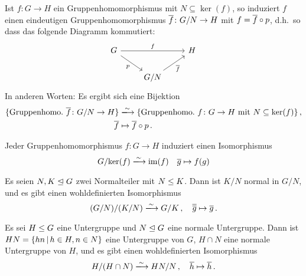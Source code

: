 \begin{theorem}[Homomorphiesatz]
  Ist $f \colon G \to H$ ein Gruppenhomomorphismus mit $N \subseteq \ker(f)$, so induziert $f$ einen eindeutigen Gruppenhomomorphismus $\overline{f} \colon G/N \to H$ mit $f = \overline{f} \circ p$, d.h.\ so dass das folgende Diagramm kommutiert:
  \[
    \begin{tikzcd}
        G
        \arrow{rr}[above]{f}
        \arrow{dr}[below left]{p}
      & {}
      & H
      \\
        {}
      & G/N
        \arrow{ru}[below right]{\induced{f}}
      & {}
    \end{tikzcd}
  \]
  In anderen Worten:
  Es ergibt sich eine Bijektion
  \begin{align*}
                            \{ \text{Gruppenhomo.\ $\induced{f} \colon G/N \to H$} \}
    &\xlongrightarrow{\sim} \{ \text{Gruppenhomo.\ $f \colon G \to H$ mit $N \subseteq \ker(f)$} \} \,,  \\
                            \induced{f}
    &\mapsto                \induced{f} \circ p \,.
  \end{align*}
\end{theorem}

\begin{corollary}[1.\ Isomorphiesatz]
  Jeder Gruppenhomomorphismus $f \colon G \to H$ induziert einen Isomorphismus
  \[
                            G/{\ker(f)}
    \xlongrightarrow{\sim}  \im(f)
    \quad                   \class{g}
    \mapsto                 f(g)
  \]
\end{corollary}

\begin{corollary}[2.\ Isomorphiesatz]
  Es seien $N, K \mathrel{\trianglelefteq} G$ zwei Normalteiler mit $N \mathrel{\leq} K$.
  Dann ist $K/N$ normal in $G/N$, und es gibt einen wohldefinierten Isomorphismus
  \[
                            (G/N)/(K/N)
    \xlongrightarrow{\sim}  G/K \,,
    \quad                   \class{ \class{g} }
    \mapsto                 \class{g} \,.
  \]
\end{corollary}

\begin{corollary}[3.\ Isomorphiesatz]
  Es sei $H \mathrel{\leq} G$ eine Untergruppe und $N \mathrel{\trianglelefteq} G$ eine normale Untergruppe.
  Dann ist $HN = \{hn \suchthat h \in H, n \in N\}$ eine Untergruppe von $G$, $H \cap N$ eine normale Untergruppe von $H$, und es gibt einen wohldefinierten Isomorphismus
  \[
                            H/(H \cap N)
    \xlongrightarrow{\sim}  HN/N \,,
    \quad                   \class{h}
    \mapsto                 \class{h} \,.
  \]
\end{corollary}



